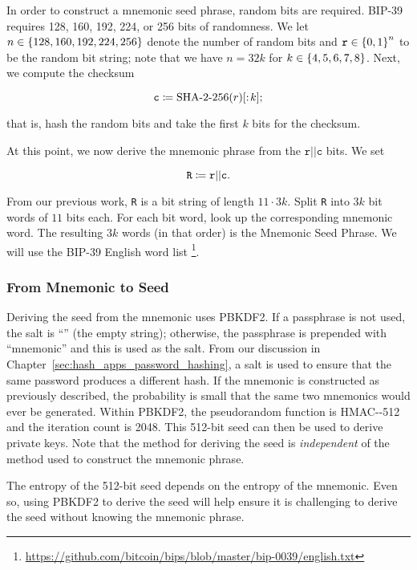 In order to construct a mnemonic seed phrase, random bits are required.
BIP-39 requires 128, 160, 192, 224, or 256 bits of randomness.
We let $n\in\left\{ 128, 160, 192, 224, 256 \right\}$ denote the number
of random bits and $\texttt{r}\in\left\{ 0,1 \right\}^{n}$ to be the random bit string;
note that we have $n = 32k$ for $k\in\left\{ 4,5,6,7,8 \right\}$.
Next, we compute the checksum

\begin{equation}
    \texttt{c} \mathDef{} \text{\ShaTwo{}-256}(r)[:\!k];
\end{equation}

\noindent
that is, hash the random bits and take the first $k$ bits for the checksum.

At this point, we now derive the mnemonic phrase from the
$\texttt{r}||\texttt{c}$ bits.
We set

\begin{equation}
    \texttt{R} \coloneqq{} \texttt{r}||\texttt{c}.
\end{equation}

\noindent
From our previous work, \texttt{R} is a bit string of length $11\cdot3k$.
Split \texttt{R} into $3k$ bit words of $11$ bits each.
For each bit word, look up the corresponding mnemonic word.
The resulting $3k$ words (in that order) is the Mnemonic Seed Phrase.
We will use the BIP-39 English word list%
\footnote{\url{https://github.com/bitcoin/bips/blob/master/bip-0039/english.txt}}.

\subsubsection{From Mnemonic to Seed}

Deriving the seed from the mnemonic uses PBKDF2.
If a passphrase is not used, the \gls{salt} is ``'' (the empty string);
otherwise, the passphrase is prepended with ``mnemonic'' and
this is used as the \gls{salt}.
From our discussion in Chapter~\ref{sec:hash_apps_password_hashing},
a \gls{salt} is used to ensure that the same password produces
a different hash.
If the mnemonic is constructed as previously described,
the probability is small that the same two mnemonics would ever be generated.
Within PBKDF2, the pseudorandom function is HMAC-\ShaTwo{}-512
and the iteration count is 2048.
This 512-bit seed can then be used to derive private keys.
Note that the method for deriving the seed is \emph{independent}
of the method used to construct the mnemonic phrase.

The entropy of the 512-bit seed depends on the entropy of the mnemonic.
Even so, using PBKDF2 to derive the seed will help ensure
it is challenging to derive the seed without knowing the mnemonic phrase.

